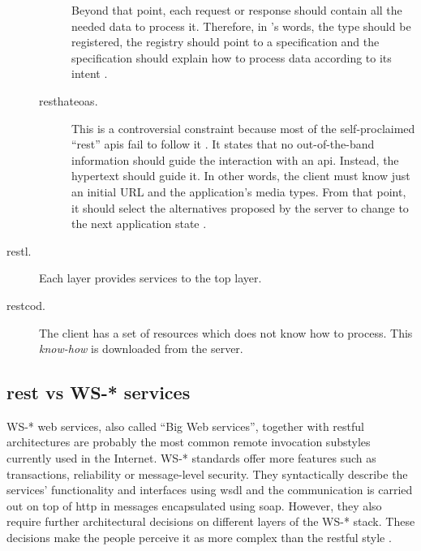 \begin{description}
\begin{description}
	                        Beyond that point, each request or response should contain all the needed data to process it.
	                        Therefore, in \citeauthor{fielding_architectural_2000}'s words,
	                        the type should be registered,
	                        the registry should point to a specification and 
	                        the specification should explain how to process data according to its intent \citep{wahbe_self-descriptive_2010}. %
	\item[\acf{resthateoas}.] This is a controversial constraint because most of the self-proclaimed ``\ac{rest}'' \acp{api} fail to follow it \citep{moore_hypermedia_2010,house_how_2012}.
	                           It states that no out-of-the-band information should guide the interaction with an \ac{api}.
	                           Instead, the hypertext should guide it.
	                           In other words, the client must know just an initial URL and the application's media types.
	                           From that point, it should select the alternatives proposed by the server to change to the next application state \citep{fielding_rest_2008}.
    \end{description}
 \item[\acf{restl}.] Each layer provides services to the top layer. %
 \item[\acf{restcod}.] The client has a set of resources which does not know how to process.
                        This \emph{know-how} is downloaded from the server.
\end{description}



\subsection{\ac{rest} vs WS-* services}
\label{sec:protocols}

WS-* web services, also called ``Big Web services'', together with \acs{rest}ful architectures are probably the most common remote invocation substyles currently used in the Internet.
WS-* standards offer more features such as transactions, reliability or message-level security.
They syntactically describe the services' functionality and interfaces using \ac{wsdl} and the communication is carried out on top of \ac{http} in messages encapsulated using \ac{soap}.
However, they also require further architectural decisions on different layers of the WS-* stack.
These decisions make the people perceive it as more complex than the \ac{rest}ful style \citep{guinard_search_2011}.

